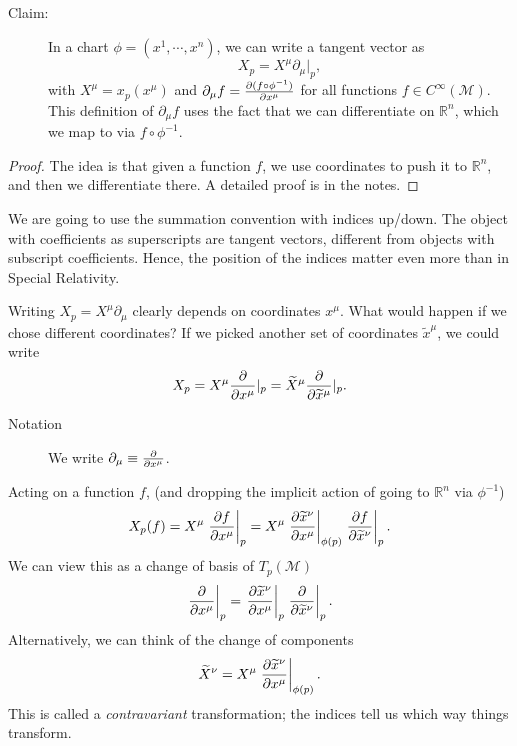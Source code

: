 \begin{description}
  \item[Claim:] In a chart $\phi= (x^1, \cdots, x^n)$, we can write a tangent vector as
    \begin{equation}
      X_p = X^\mu \partial_\mu \rvert_p,
    \end{equation}
    with $X^\mu = x_p(x^\mu)$ and $\partial_\mu f = \pdv{(f \circ \phi^{-1})}{x^\mu}$ for all functions $f \in C^\infty(\mathcal{M})$. This definition of $\partial_\mu f$ uses the fact that we can differentiate on $\mathbb{R}^n$, which we map to via $f \circ \phi^{-1}$.
\end{description}
\begin{proof}
  The idea is that given a function $f$, we use coordinates to push it to $\mathbb{R}^n$, and then we differentiate there.
  A detailed proof is in the notes.
\end{proof}

\begin{leftbar}
  \begin{remark}
    We are going to use the summation convention with indices up/down.
    The object with coefficients as superscripts are tangent vectors, different from objects with subscript coefficients. Hence, the position of the indices matter even more than in Special Relativity.
  \end{remark}
\end{leftbar}

Writing $X_p = X^\mu \partial_\mu$ clearly depends on coordinates $x^\mu$. What would happen if we chose different coordinates?
If we picked another set of coordinates $\widetilde x^\mu$, we could write
\begin{equation}
  X_p = X^\mu \pdv{}{x^\mu}\rvert_p = \widetilde X^\mu \pdv{}{\widetilde x^\mu} \rvert_p.
\end{equation}
\begin{description}
  \item[Notation] We write $\partial_\mu \equiv \pdv{}{x^\mu}$.
\end{description}
Acting on a function $f$, (and dropping the implicit action of going to $\mathbb{R}^n$ via $\phi^{-1}$)
\begin{equation}
  X_p(f) = X^\mu \left.\pdv{f}{x^\mu} \right\rvert_p = X^\mu \left.\pdv{\widetilde x^\nu}{x^\mu} \right\rvert_{\phi(p)} \left.\pdv{f}{\widetilde x^\nu} \right\rvert_p.
\end{equation}
We can view this as a change of basis of $T_p(\mathcal{M})$
\begin{equation}
 \left. \pdv{}{x^\mu} \right\rvert_p = \left.\pdv{\widetilde x^\nu}{x^\mu}\right\rvert_p \left.\pdv{}{\widetilde x^\nu} \right\rvert_p.
\end{equation}
Alternatively, we can think of the change of components
\begin{equation}
  \widetilde X^\nu = X^\mu \left.\pdv{\widetilde x^\nu}{x^\mu} \right\rvert_{\phi(p)}.
\end{equation}
This is called a \emph{contravariant} transformation; the indices tell us which way things transform.

